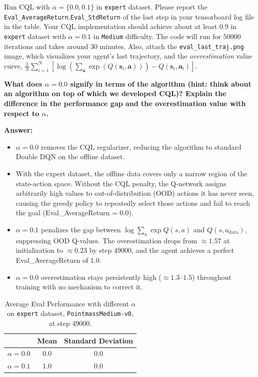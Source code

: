 \documentclass{article}
\def\rva{{\mathbf{a}}}
\def\rvs{{\mathbf{s}}}
\begin{document}
Run CQL with $\alpha = \{ 0.0, 0.1 \}$ in \texttt{expert} dataset. Please report the \texttt{Eval\_AverageReturn},\texttt{Eval\_StdReturn} of the last step in your tensorboard log file in the table. Your CQL implementation should achieve about at least $0.9$ in \texttt{expert} dataset with $\alpha=0.1$ in \texttt{Medium} difficulty. The code will run for $50000$ iterations and takes around $30$ minutes. Also, attach the \texttt{eval\_last\_traj.png} image, which visualizes your agent's last trajectory, and the \textit{overestimation} value curve, $\frac{1}{N} \sum_{i=1}^N\left[\log \left(\sum_\rva \exp \left(Q\left(\rvs_i, \rva\right)\right)\right)-Q\left(\rvs_i, \rva_i\right)\right]$.

\textbf{What does $\alpha=0.0$ signify in terms of the algorithm (hint: think about an algorithm on top of which we developed CQL)? Explain the difference in the performance gap and the overestimation value with respect to $\alpha$.
}

\textbf{Answer:}
\begin{itemize}
    \item $\alpha=0.0$ removes the CQL regularizer, reducing the algorithm to standard Double DQN on the offline dataset.
    \item With the expert dataset, the offline data covers only a narrow region of the state-action space. Without the CQL penalty, the Q-network assigns arbitrarily high values to out-of-distribution (OOD) actions it has never seen, causing the greedy policy to repeatedly select those actions and fail to reach the goal (Eval\_AverageReturn = 0.0).
    \item $\alpha=0.1$ penalizes the gap between $\log\sum_a \exp Q(s,a)$ and $Q(s,a_\text{data})$, suppressing OOD Q-values. The overestimation drops from $\approx 1.57$ at initialization to $\approx 0.23$ by step 49000, and the agent achieves a perfect Eval\_AverageReturn of 1.0.
    \item $\alpha=0.0$ overestimation stays persistently high ($\approx 1.3$--$1.5$) throughout training with no mechanism to correct it.
\end{itemize}

\begin{table}[H]
    \centering
    \caption{Average Eval Performance with different $\alpha$ on \texttt{expert} dataset, \texttt{PointmassMedium-v0}, at step 49000.}
    \label{tab:pointmass_CQL_results}
    \begin{tabular}{c|cc}
        \toprule
        & Mean & Standard Deviation \\
        \midrule
        \texttt{$\alpha = 0.0$} & 0.0 & 0.0 \\
        \texttt{$\alpha = 0.1$} & 1.0 & 0.0 \\
        \bottomrule
    \end{tabular}
\end{table}
\end{document}
